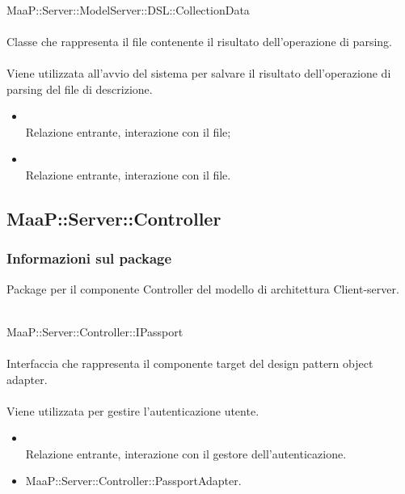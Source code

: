 	\\
	MaaP::Server::ModelServer::DSL::CollectionData\\
	\\
	Classe che rappresenta il file contenente il risultato dell'operazione di parsing.\\
	\\
	Viene utilizzata all'avvio del sistema per salvare il risultato dell'operazione di parsing del file di descrizione.
	\begin{itemize}
	\item{}\\
	Relazione entrante, interazione con il file;
	\item{}\\
	Relazione entrante, interazione con il file.
	\end{itemize}
	

\subsection{MaaP::Server::Controller}
\subsubsection{Informazioni sul package}
Package per il componente Controller del modello di architettura Client-server.

	\\
	MaaP::Server::Controller::IPassport\\
	\\
	Interfaccia che rappresenta il componente target del design pattern object adapter.\\
	\\
	Viene utilizzata per gestire l'autenticazione utente.
	\begin{itemize}
	\item{}\\
	Relazione entrante, interazione con il gestore dell'autenticazione.
	\end{itemize}
	\begin{itemize}
	\item MaaP::Server::Controller::PassportAdapter.
	\end{itemize}
	
